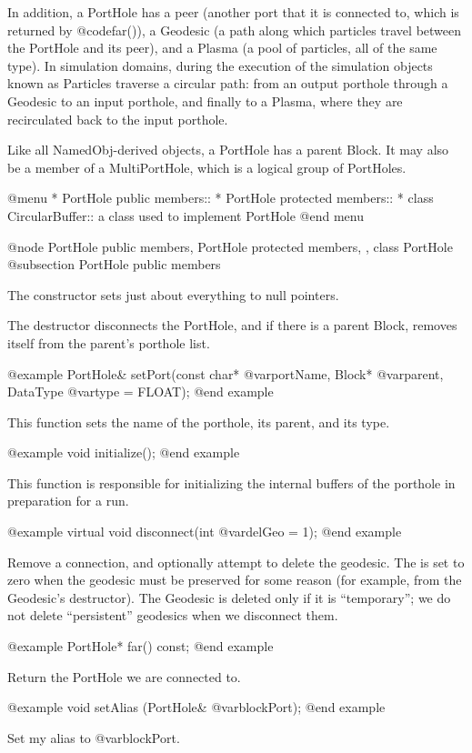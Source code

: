 In addition, a PortHole has a peer (another port that it is connected
to, which is returned by @code{far()}), a Geodesic (a path along which
particles travel between the PortHole and its peer), and a Plasma (a
pool of particles, all of the same type).  In simulation domains,
during the execution of the simulation objects known as Particles
traverse a circular path: from an output porthole through a Geodesic to
an input porthole, and finally to a Plasma, where they are recirculated
back to the input porthole.

Like all NamedObj-derived objects, a PortHole has a parent Block.  It
may also be a member of a MultiPortHole, which is a logical group of
PortHoles.

@menu
* PortHole public members::  
* PortHole protected members::  
* class CircularBuffer::  a class used to implement PortHole
@end menu

@node PortHole public members, PortHole protected members,  , class PortHole
@subsection PortHole public members

The constructor sets just about everything to null pointers.

The destructor disconnects the PortHole, and if there is a parent Block,
removes itself from the parent's porthole list.

@example
PortHole& setPort(const char* @var{portName}, Block* @var{parent},
                 DataType @var{type} = FLOAT);
@end example

This function sets the name of the porthole, its parent, and
its type.

@example
void initialize();
@end example

This function is responsible for initializing the internal buffers
of the porthole in preparation for a run.

@example
virtual void disconnect(int @var{delGeo} = 1);
@end example

Remove a connection, and optionally attempt to delete the geodesic.  The
is set to zero when the geodesic must be preserved for some reason (for
example, from the Geodesic's destructor).  The Geodesic is deleted only
if it is ``temporary''; we do not delete ``persistent'' geodesics when
we disconnect them.

@example
PortHole* far() const;
@end example

Return the PortHole we are connected to.

@example
void setAlias (PortHole& @var{blockPort});
@end example

Set my alias to @var{blockPort}.

